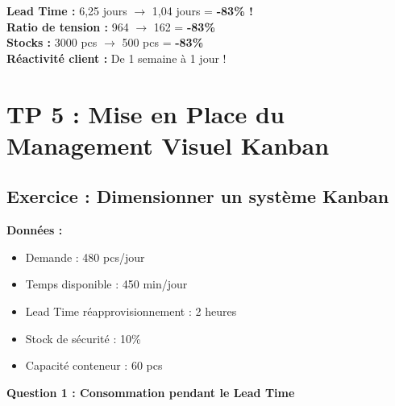 \documentclass[12pt,a4paper]{article}
\begin{document}
\begin{center}
\end{center}

\begin{tcolorbox}[colback=green!10, colframe=green!50!black, title=Gains de l'État Futur]
\textbf{Lead Time :} 6,25 jours $\rightarrow$ 1,04 jours = \textbf{-83\% !}\\
\textbf{Ratio de tension :} 964 $\rightarrow$ 162 = \textbf{-83\%}\\
\textbf{Stocks :} 3000 pcs $\rightarrow$ 500 pcs = \textbf{-83\%}\\
\textbf{Réactivité client :} De 1 semaine à 1 jour !
\end{tcolorbox}

\newpage

\section{TP 5 : Mise en Place du Management Visuel Kanban}

\subsection{Exercice : Dimensionner un système Kanban}

\textbf{Données :}
\begin{itemize}
    \item Demande : 480 pcs/jour
    \item Temps disponible : 450 min/jour
    \item Lead Time réapprovisionnement : 2 heures
    \item Stock de sécurité : 10\%
    \item Capacité conteneur : 60 pcs
\end{itemize}

\textbf{Question 1 : Consommation pendant le Lead Time}
\end{document}
